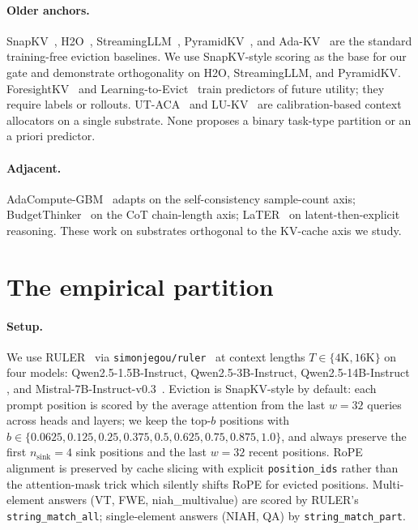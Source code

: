 \documentclass{article} %
\begin{document}
\paragraph{Older anchors.}
SnapKV~\citep{arxiv240414469}, H2O~\citep{arxiv230614048},
StreamingLLM~\citep{arxiv230917453}, PyramidKV~\citep{arxiv240602069}, and
Ada-KV~\citep{arxiv240711550} are the standard
training-free eviction baselines. We use SnapKV-style scoring as the base for
our gate and demonstrate orthogonality on H2O, StreamingLLM, and PyramidKV.
ForesightKV~\citep{arxiv260203203} and Learning-to-Evict~\citep{arxiv260210238}
train predictors of future utility; they require labels or rollouts. UT-ACA~%
\citep{arxiv260318446} and LU-KV~\citep{arxiv260208585} are calibration-based
context allocators on a single substrate. None proposes a binary task-type
partition or an a priori predictor.

\paragraph{Adjacent.}
AdaCompute-GBM~\citep{arxiv260414853} adapts on the self-consistency sample-count
axis; BudgetThinker~\citep{arxiv250817196} on the CoT chain-length axis;
LaTER~\citep{arxiv260507315} on latent-then-explicit reasoning. These work on
substrates orthogonal to the KV-cache axis we study.

\section{The empirical partition}
\label{sec:partition}

\paragraph{Setup.} We use RULER~\citep{arxiv240406654} via
\texttt{simonjegou/ruler}~\citep{ruler-hf} at context lengths
$T \in \{4\mathrm{K}, 16\mathrm{K}\}$
on four models: Qwen2.5-1.5B-Instruct, Qwen2.5-3B-Instruct, Qwen2.5-14B-Instruct
\citep{arxiv241215115}, and Mistral-7B-Instruct-v0.3~\citep{arxiv231006825}. Eviction is SnapKV-style by default: each prompt
position is scored by the average attention from the last $w = 32$ queries across
heads and layers; we keep the top-$b$ positions with $b \in
\{0.0625, 0.125, 0.25, 0.375, 0.5, 0.625, 0.75, 0.875, 1.0\}$, and always
preserve the first $n_{\text{sink}} = 4$ sink positions and the last $w = 32$
recent positions. RoPE alignment is preserved by cache slicing with explicit
\texttt{position\_ids} rather than the attention-mask trick which silently shifts
RoPE for evicted positions. Multi-element answers (VT, FWE, niah\_multivalue)
are scored by RULER's \texttt{string\_match\_all}; single-element answers
(NIAH, QA) by \texttt{string\_match\_part}.
\end{document}

